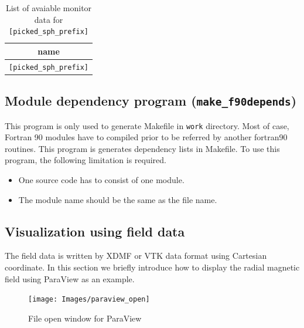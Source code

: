 %
%
\begin{table}[htp]
\caption{List of avaiable monitor data for {\tt [picked\_sph\_prefix]}}
\begin{center} 
\begin{tabular}{|c|}
\hline
 name  \\ \hline \hline
\verb|[picked_sph_prefix]| \\ \hline
\end{tabular}
\end{center}
\label{table:picked_sph_prefix}
\end{table}
%

\subsection{Module dependency program ({\tt make\_f90depends})}
\label{sec:make_f90depends}
This program is only used to generate Makefile in {\tt work} directory. Most of case, Fortran 90 modules have to compiled prior to be referred by another fortran90 routines. This program is generates dependency lists in Makefile. To use this program, the following limitation is required.
\begin{itemize}
\item One source code has to consist of one module.
\item The module name should be the same as the file name.
\end{itemize}
%

\subsection{Visualization using field data}
\label{sec:paraview}
The field data is written by XDMF or VTK data format using Cartesian coordinate. In this section we briefly introduce how to display the radial magnetic field using ParaView as an example.
%
\begin{figure}[htbp]
\begin{center}
\texttt{[image: Images/paraview\_open]}
\caption{File open window for ParaView}
\label{fig:paraview_load}
\end{center}
\end{figure}
%

